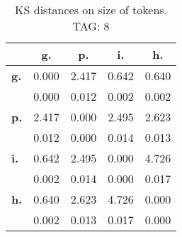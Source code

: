 \begin{table}[h!]
\begin{center}
\begin{tabular}{| l || c | c | c | c |}\hline
 & {\bf g.} & {\bf p.} & {\bf i.} & {\bf h.} \\\hline\hline
{\bf g.} & 0.000 & 2.417 & 0.642 & 0.640 \\
{\bf } & 0.000 & 0.012 & 0.002 & 0.002 \\\hline
{\bf p.} & 2.417 & 0.000 & 2.495 & 2.623 \\
{\bf } & 0.012 & 0.000 & 0.014 & 0.013 \\\hline
{\bf i.} & 0.642 & 2.495 & 0.000 & 4.726 \\
{\bf } & 0.002 & 0.014 & 0.000 & 0.017 \\\hline
{\bf h.} & 0.640 & 2.623 & 4.726 & 0.000 \\
{\bf } & 0.002 & 0.013 & 0.017 & 0.000 \\\hline
\end{tabular}
\caption{KS distances on size of tokens. TAG: 8}
\end{center}
\end{table}
